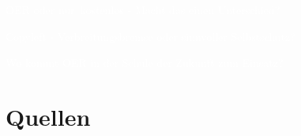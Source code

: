 \documentclass[14pt, usenames, dvipsnames, notes]{beamer}
\begin{document}


\begin{frame}{}
    \begin{center}
        \textcolor{white}{\LARGE OER oder \glqq nur\grqq~kostenlos - Macht das einen Unterschied?}
    \end{center}
\end{frame}

\begin{frame}{}
    \begin{center}
        \textcolor{white}{\LARGE Copyleft - Verbreitungsbremse oder sinnvoller Selbstschutz?}
    \end{center}
\end{frame}

\begin{frame}{}
    \begin{center}
        \textcolor{white}{\LARGE Wo kommt OER in der Schule der Zukunft zum Einsatz?}
    \end{center}
\end{frame}



\section{Quellen}

\begin{frame}{}
    \nocite{*}
    

    \twocolumn
    
\end{frame}
\end{document}
